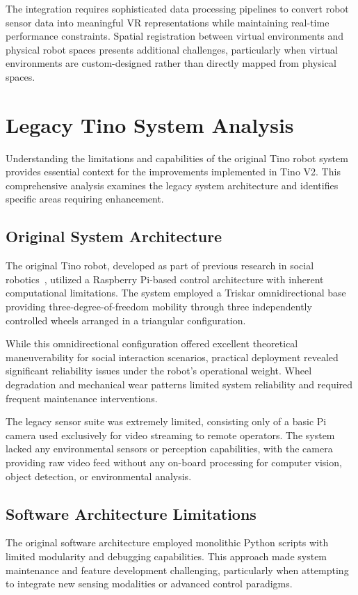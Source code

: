 The integration requires sophisticated data processing pipelines to convert robot sensor data into meaningful VR representations while maintaining real-time performance constraints. Spatial registration between virtual environments and physical robot spaces presents additional challenges, particularly when virtual environments are custom-designed rather than directly mapped from physical spaces.

\section{Legacy Tino System Analysis}
Understanding the limitations and capabilities of the original Tino robot system provides essential context for the improvements implemented in Tino V2. This comprehensive analysis examines the legacy system architecture and identifies specific areas requiring enhancement.

\subsection{Original System Architecture}
The original Tino robot, developed as part of previous research in social robotics~\cite{cardillo2024thesis}, utilized a Raspberry Pi-based control architecture with inherent computational limitations. The system employed a Triskar omnidirectional base providing three-degree-of-freedom mobility through three independently controlled wheels arranged in a triangular configuration.

While this omnidirectional configuration offered excellent theoretical maneuverability for social interaction scenarios, practical deployment revealed significant reliability issues under the robot's operational weight. Wheel degradation and mechanical wear patterns limited system reliability and required frequent maintenance interventions.

The legacy sensor suite was extremely limited, consisting only of a basic Pi camera used exclusively for video streaming to remote operators. The system lacked any environmental sensors or perception capabilities, with the camera providing raw video feed without any on-board processing for computer vision, object detection, or environmental analysis.

\subsection{Software Architecture Limitations}
The original software architecture employed monolithic Python scripts with limited modularity and debugging capabilities. This approach made system maintenance and feature development challenging, particularly when attempting to integrate new sensing modalities or advanced control paradigms.

